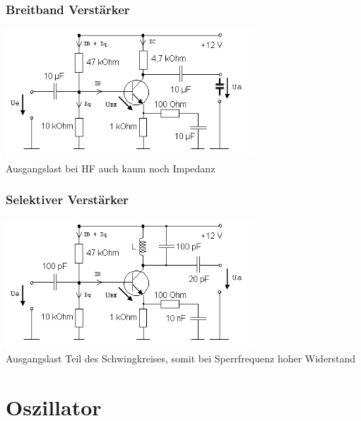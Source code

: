 \begin{frame}
    \frametitle{Breitband Verstärker}
    \begin{center}
        \includegraphics[width=0.7\textwidth]{a07/Breitbandverstarker.png}
        \tiny \hyperlink{refs}{\cite{wm}} \\[3em]
     	\large Ausgangslast bei HF auch kaum noch Impedanz
     \end{center}
\end{frame}

\begin{frame}
    \frametitle{Selektiver Verstärker}
    \begin{center}
        \includegraphics[width=0.7\textwidth]{a07/Selektiver_Verstarker.png}
        \tiny \hyperlink{refs}{\cite{wm}} \\[3em]
     	\large Ausgangslast Teil des Schwingkreises, somit bei Sperrfrequenz hoher Widerstand
     \end{center}
\end{frame}
  
\section*{Oszillator}

